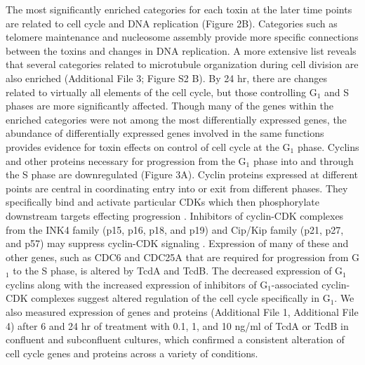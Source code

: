 The most significantly enriched categories for each toxin at the later time points are related to cell cycle and DNA replication (Figure 2B). Categories such as telomere maintenance and nucleosome assembly provide more specific connections between the toxins and changes in DNA replication. A more extensive list reveals that several categories related to microtubule organization during cell division are also enriched (Additional File 3; Figure S2 B). By 24 hr, there are changes related to virtually all elements of the cell cycle, but those controlling G$_{\text{1}}$ and S phases are more significantly affected. Though many of the genes within the enriched categories were not among the most differentially expressed genes, the abundance of differentially expressed genes involved in the same functions provides evidence for toxin effects on control of cell cycle at the G$_{\text{1}}$ phase. Cyclins and other proteins necessary for progression from the G$_{\text{1}}$ phase into and through the S phase are downregulated (Figure 3A). Cyclin proteins expressed at different points are central in coordinating entry into or exit from different phases. They specifically bind and activate particular CDKs which then phosphorylate downstream targets effecting progression \cite{Murray:2004ge}. Inhibitors of cyclin-CDK complexes from the INK4 family (p15, p16, p18, and p19) and Cip/Kip family (p21, p27, and p57) may suppress cyclin-CDK signaling \cite{Denicourt:2004bw}. Expression of many of these and other genes, such as CDC6 and CDC25A that are required for progression from G$_{\text{1}}$ to the S phase, is altered by TcdA and TcdB. The decreased expression of G$_{\text{1}}$ cyclins along with the increased expression of inhibitors of G$_{\text{1}}$-associated cyclin-CDK complexes suggest altered regulation of the cell cycle specifically in G$_{\text{1}}$. We also measured expression of genes and proteins (Additional File 1, Additional File 4) after 6 and 24 hr of treatment with 0.1, 1, and 10 ng/ml of TcdA or TcdB in confluent and subconfluent cultures, which confirmed a consistent alteration of cell cycle genes and proteins across a variety of conditions.

